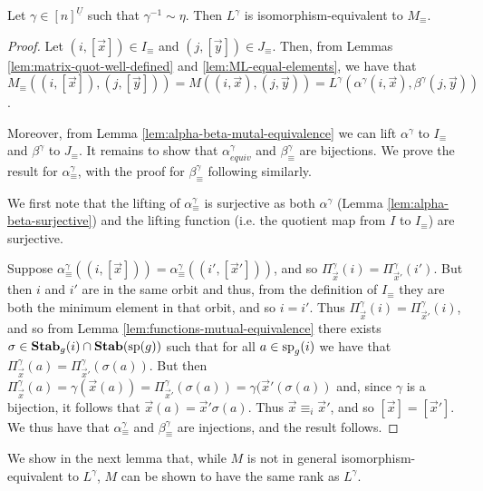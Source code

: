 \documentclass[../paper.tex]{subfiles}
\begin{document}
\begin{thm}
  Let $\gamma \in [n]^{\underline{U}}$ such that $\gamma^{-1} \sim \eta$. Then
  $L^{\gamma}$ is isomorphism-equivalent to $M_{\equiv}$.
  \label{thm:LM-equivalence}
\end{thm}
\begin{proof}
  Let $(i, [\vec{x}]) \in I_\equiv$ and $(j, [\vec{y}]) \in J_\equiv$. Then,
  from Lemmas \ref{lem:matrix-quot-well-defined} and
  \ref{lem:ML-equal-elements}, we have that $M_\equiv ((i, [\vec{x}]), (j,
  [\vec{y}])) = M ((i, \vec{x}), (j, \vec{y})) = L^{\gamma}(\alpha^{\gamma}(i,
  \vec{x}), \beta^{\gamma}(j, \vec{y}))$.

  Moreover, from Lemma \ref{lem:alpha-beta-mutal-equivalence} we can lift
  $\alpha^\gamma$ to $I_\equiv$ and $\beta^{\gamma}$ to $J_\equiv$. It remains
  to show that $\alpha^\gamma_{equiv}$ and $\beta^{\gamma}_{\equiv}$ are
  bijections. We prove the result for $\alpha^{\gamma}_{\equiv}$, with the proof
  for $\beta^\gamma_\equiv$ following similarly.

  We first note that the lifting of $\alpha^{\gamma}_{\equiv}$ is surjective as
  both $\alpha^{\gamma}$ (Lemma \ref{lem:alpha-beta-surjective}) and the lifting
  function (i.e. the quotient map from $I$ to $I_\equiv$) are surjective.

  Suppose $\alpha^{\gamma}_\equiv((i, [\vec{x}])) = \alpha^{\gamma}_\equiv((i',
  [\vec{x}']))$, and so $\Pi^{\gamma}_{\vec{x}}(i) =
  \Pi^{\gamma}_{\vec{x}'}(i')$. But then $i$ and $i'$ are in the same orbit and
  thus, from the definition of $I_{\equiv}$ they are both the minimum element in
  that orbit, and so $i = i'$. Thus $\Pi^{\gamma}_{\vec{x}}(i) =
  \Pi^{\gamma}_{\vec{x}'}(i)$, and so from Lemma
  \ref{lem:functions-mutual-equivalence} there exists $\sigma \in \text{\textbf{Stab}}_g(i)
  \cap \text{\textbf{Stab}} (\text{sp} (g))$ such that for all $a \in \text{sp}_g(i)$ we have that
  $\Pi^{\gamma}_{\vec{x}}(a) = \Pi^{\gamma}_{\vec{x}'} (\sigma (a))$. But then
  $\Pi^{\gamma}_{\vec{x}}(a) = \gamma (\vec{x}(a)) =
  \Pi^{\gamma}_{\vec{x}'}(\sigma (a)) = \gamma (\vec{x}' (\sigma (a))$ and,
  since $\gamma$ is a bijection, it follows that $\vec{x}(a) = \vec{x}' \sigma
  (a)$. Thus $\vec{x} \equiv_i \vec{x}'$, and so $[\vec{x}] = [\vec{x}']$. We
  thus have that $\alpha^{\gamma}_\equiv$ and $\beta^{\gamma}_\equiv$ are
  injections, and the result follows.
\end{proof}

We show in the next lemma that, while $M$ is not in general
isomorphism-equivalent to $L^\gamma$, $M$ can be shown to have the same rank as
$L^{\gamma}$.
\end{document}

